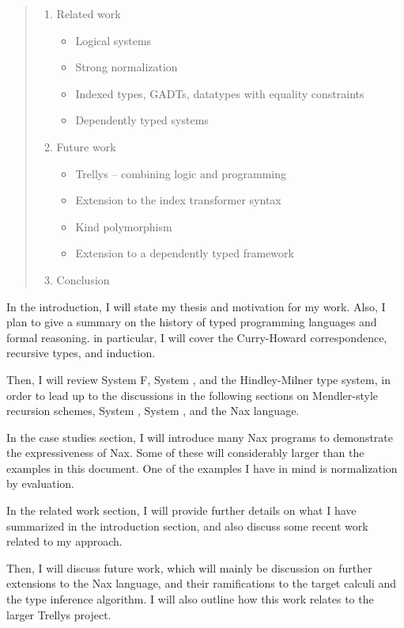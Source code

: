 \begin{quote}
\begin{enumerate}[1.]
\item Related work
  \begin{itemize}
    \item Logical systems
    \item Strong normalization
    \item Indexed types, GADTs, datatypes with equality constraints
    \item Dependently typed systems
  \end{itemize}
  
\item Future work
  \begin{itemize}
    \item Trellys -- combining logic and programming
    \item Extension to the index transformer syntax
    \item Kind polymorphism
    \item Extension to a dependently typed framework
 \end{itemize}
 
\item Conclusion
\end{enumerate}
\end{quote}

In the introduction, I will state my thesis and motivation for my work.
Also, I plan to give a summary on the history of typed programming
languages and formal reasoning. in particular, I will cover the 
Curry-Howard correspondence, recursive types, and induction.

Then, I will review System \textsf{F}, System \Fw, and the Hindley-Milner
type system, in order to lead up to the discussions in the following
sections on Mendler-style recursion schemes, System \Fi, System \Fixi, and
the Nax language.

In the case studies section, I will introduce many Nax programs to
demonstrate the expressiveness of Nax. Some of these will considerably
larger than the examples in this document. One of the examples I have in
mind is normalization by evaluation.

In the related work section, I will provide further details on what I have
summarized in the introduction section, and also discuss some recent work
related to my approach.

Then, I will discuss future work, which will mainly be discussion on further
extensions to the Nax language, and their ramifications to
the target calculi and the type inference algorithm. I will also
outline how this work relates to the larger Trellys project.

